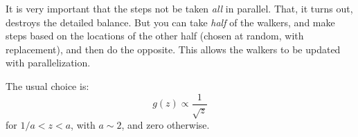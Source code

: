 It is very important that the steps not be taken {\it all} in
parallel. That, it turns out, destroys the detailed balance. But you
can take {\it half} of the walkers, and make steps based on the
locations of the other half (chosen at random, with replacement), and
then do the opposite. This allows the walkers to be updated with
parallelization.

The usual choice is:
\begin{equation}
g(z) \propto \frac{1}{\sqrt{z}}
\end{equation}
for $1/a < z < a$, with $a\sim 2$, and zero otherwise.
